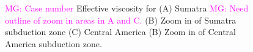 \documentclass[12pt]{article}
\newcommand{\mgnote}[1]{\textcolor{magenta}{MG: #1}}
\begin{document}
{\begin{figure}[H]
\hspace{0.2cm}
\caption{\mgnote{ Case number}
Effective viscosity for (A) Sumatra \mgnote{Need outline of zoom in areas in A and C.} (B) Zoom in of Sumatra subduction zone (C) Central America (B) Zoom in of Central America subduction zone.}
\label{fig:visc_smaller}
\end{figure}

}
\end{document}
